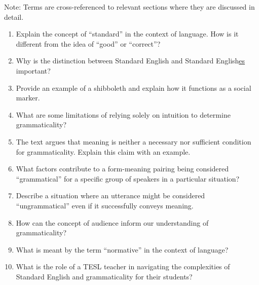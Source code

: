 \noindent Note: Terms are cross-referenced to relevant sections where they are discussed in detail.



\begin{tcolorbox}[title=Exercises, colback=white]
    
\begin{enumerate}[noitemsep]
    \item Explain the concept of ``standard'' in the context of language. How is it different from the idea of ``good'' or ``correct''?
    \item Why is the distinction between Standard English and Standard English\uline{es} important?
    \item Provide an example of a shibboleth and explain how it functions as a social marker.
    \item What are some limitations of relying solely on intuition to determine grammaticality?
    \item The text argues that meaning is neither a necessary nor sufficient condition for grammaticality. Explain this claim with an example.
    \item What factors contribute to a form-meaning pairing being considered ``grammatical'' for a specific group of speakers in a particular situation?
    \item Describe a situation where an utterance might be considered ``ungrammatical'' even if it successfully conveys meaning.
    \item How can the concept of audience inform our understanding of grammaticality?
    \item What is meant by the term ``normative'' in the context of language?
    \item What is the role of a TESL teacher in navigating the complexities of Standard English and grammaticality for their students?
\end{enumerate}

\end{tcolorbox}

